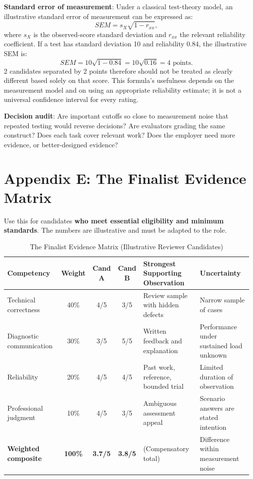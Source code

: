\textbf{Standard error of measurement}: Under a classical test-theory model, an illustrative standard error of measurement can be expressed as:
\begin{equation}
SEM = s_X \sqrt{1 - r_{xx}},
\end{equation}
where $s_X$ is the observed-score standard deviation and $r_{xx}$ the relevant reliability coefficient. If a test has standard deviation 10 and reliability 0.84, the illustrative SEM is:
\begin{equation}
SEM = 10 \sqrt{1 - 0.84} = 10 \sqrt{0.16} = 4\text{ points}.
\end{equation}
2 candidates separated by 2 points therefore should not be treated as clearly different based solely on that score. This formula's usefulness depends on the measurement model and on using an appropriate reliability estimate; it is not a universal confidence interval for every rating.

\textbf{Decision audit}: Are important cutoffs so close to measurement noise that repeated testing would reverse decisions? Are evaluators grading the same construct? Does each task cover relevant work? Does the employer need more evidence, or better-designed evidence?

\section*{Appendix E: The Finalist Evidence Matrix}

Use this for candidates \textbf{who meet essential eligibility and minimum standards}. The numbers are illustrative and must be adapted to the role.

\begin{table}[t]
\centering
\small
\caption{The Finalist Evidence Matrix (Illustrative Reviewer Candidates)}
\label{tab:finalist_evidence_matrix}
\begin{tabularx}{\textwidth}{p{3.4cm} c c c p{4.0cm} X}
\toprule
\textbf{Competency} & \textbf{Weight} & \textbf{Cand A} & \textbf{Cand B} & \textbf{Strongest Supporting Observation} & \textbf{Uncertainty} \\
\midrule
Technical correctness & 40\% & 4/5 & 3/5 & Review sample with hidden defects & Narrow sample of cases \\
Diagnostic communication & 30\% & 3/5 & 5/5 & Written feedback and explanation & Performance under sustained load unknown \\
Reliability & 20\% & 4/5 & 4/5 & Past work, reference, bounded trial & Limited duration of observation \\
Professional judgment & 10\% & 4/5 & 3/5 & Ambiguous assessment appeal & Scenario answers are stated intention \\
\midrule
\textbf{Weighted composite} & \textbf{100\%} & \textbf{3.7/5} & \textbf{3.8/5} & (Compensatory total) & Difference within measurement noise \\
\bottomrule
\end{tabularx}
\end{table}

